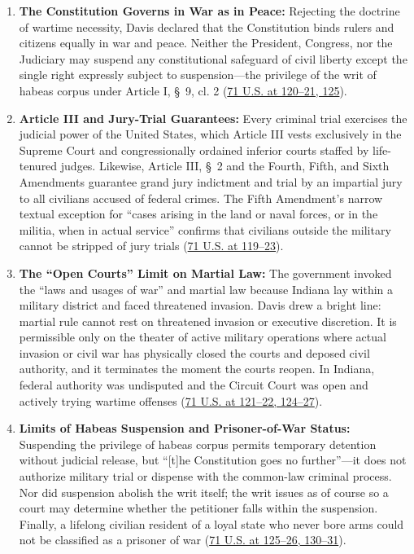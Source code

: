 \documentclass[12pt]{article}
\begin{document}
\begin{enumerate}
  \item \textbf{The Constitution Governs in War as in Peace:} Rejecting the doctrine of wartime necessity, Davis declared that the Constitution binds rulers and citizens equally in war and peace. Neither the President, Congress, nor the Judiciary may suspend any constitutional safeguard of civil liberty except the single right expressly subject to suspension---the privilege of the writ of habeas corpus under Article I, \S~9, cl. 2 (\href{https://supreme.justia.com/cases/federal/us/71/2/}{71 U.S. at 120--21, 125}).

  \item \textbf{Article III and Jury-Trial Guarantees:} Every criminal trial exercises the judicial power of the United States, which Article III vests exclusively in the Supreme Court and congressionally ordained inferior courts staffed by life-tenured judges. Likewise, Article III, \S~2 and the Fourth, Fifth, and Sixth Amendments guarantee grand jury indictment and trial by an impartial jury to all civilians accused of federal crimes. The Fifth Amendment's narrow textual exception for ``cases arising in the land or naval forces, or in the militia, when in actual service'' confirms that civilians outside the military cannot be stripped of jury trials (\href{https://supreme.justia.com/cases/federal/us/71/2/}{71 U.S. at 119--23}).

  \item \textbf{The ``Open Courts'' Limit on Martial Law:} The government invoked the ``laws and usages of war'' and martial law because Indiana lay within a military district and faced threatened invasion. Davis drew a bright line: martial rule cannot rest on threatened invasion or executive discretion. It is permissible only on the theater of active military operations where actual invasion or civil war has physically closed the courts and deposed civil authority, and it terminates the moment the courts reopen. In Indiana, federal authority was undisputed and the Circuit Court was open and actively trying wartime offenses (\href{https://supreme.justia.com/cases/federal/us/71/2/}{71 U.S. at 121--22, 124--27}).

  \item \textbf{Limits of Habeas Suspension and Prisoner-of-War Status:} Suspending the privilege of habeas corpus permits temporary detention without judicial release, but ``[t]he Constitution goes no further''---it does not authorize military trial or dispense with the common-law criminal process. Nor did suspension abolish the writ itself; the writ issues as of course so a court may determine whether the petitioner falls within the suspension. Finally, a lifelong civilian resident of a loyal state who never bore arms could not be classified as a prisoner of war (\href{https://supreme.justia.com/cases/federal/us/71/2/}{71 U.S. at 125--26, 130--31}).
\end{enumerate}
\end{document}
